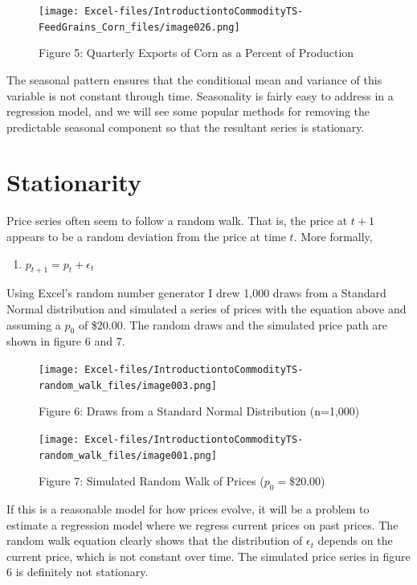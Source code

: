 \documentclass[
]{book}
\providecommand{\tightlist}{%
  \setlength{\itemsep}{0pt}\setlength{\parskip}{0pt}}
\begin{document}
\begin{figure}
\centering
\texttt{[image: Excel-files/IntroductiontoCommodityTS-FeedGrains\_Corn\_files/image026.png]}
\caption{Figure 5: Quarterly Exports of Corn as a Percent of Production}
\end{figure}

The seasonal pattern ensures that the conditional mean and variance of this variable is not constant through time. Seasonality is fairly easy to address in a regression model, and we will see some popular methods for removing the predictable seasonal component so that the resultant series is stationary.

\hypertarget{stationarity}{%
\section{Stationarity}\label{stationarity}}

Price series often seem to follow a random walk. That is, the price at \(t+1\) appears to be a random deviation from the price at time \(t\). More formally,

\begin{enumerate}
\def\labelenumi{(\arabic{enumi})}
\setcounter{enumi}{2}
\tightlist
\item
  \(p_{t+1} = p_{t} + \epsilon_t\)
\end{enumerate}

Using Excel's random number generator I drew 1,000 draws from a Standard Normal distribution and simulated a series of prices with the equation above and assuming a \(p_0\) of \$20.00. The random draws and the simulated price path are shown in figure 6 and 7.

\begin{figure}
\centering
\texttt{[image: Excel-files/IntroductiontoCommodityTS-random\_walk\_files/image003.png]}
\caption{Figure 6: Draws from a Standard Normal Distribution (n=1,000)}
\end{figure}

\begin{figure}
\centering
\texttt{[image: Excel-files/IntroductiontoCommodityTS-random\_walk\_files/image001.png]}
\caption{Figure 7: Simulated Random Walk of Prices (\(p_0 = \$20.00\))}
\end{figure}

If this is a reasonable model for how prices evolve, it will be a problem to estimate a regression model where we regress current prices on past prices. The random walk equation clearly shows that the distribution of \(\epsilon_t\) depends on the current price, which is not constant over time. The simulated price series in figure 6 is definitely not stationary.
\end{document}
